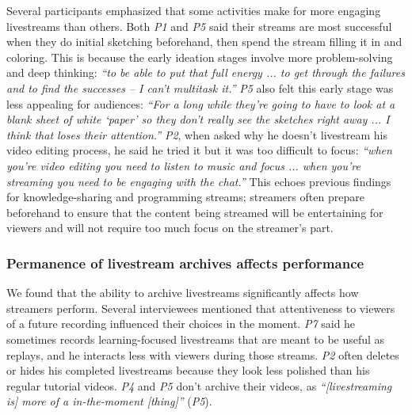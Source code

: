Several participants emphasized that some activities make for more engaging livestreams than others. Both \textit{P1} and \textit{P5} said their streams are most successful when they do initial sketching beforehand, then spend the stream filling it in and coloring. This is because the early ideation stages involve more problem-solving and deep thinking: \textit{``to be able to put that full energy ... to get through the failures and to find the successes -- I can't multitask it.''} \textit{P5} also felt this early stage was less appealing for audiences: \textit{``For a long while they're going to have to look at a blank sheet of white `paper' so they don't really see the sketches right away ... I think that loses their attention.''} \textit{P2}, when asked why he doesn't livestream his video editing process, he said he tried it but it was too difficult to focus: \textit{``when you're video editing you need to listen to music and focus ... when you're streaming you need to be engaging with the chat.''} This echoes previous findings for knowledge-sharing \cite{Lu2018a} and programming \cite{Faas2018} streams; streamers often prepare beforehand to ensure that the content being streamed will be entertaining for viewers and will not require too much focus on the streamer's part. 


\subsubsection{Permanence of livestream archives affects performance}
We found that the ability to archive livestreams significantly affects how streamers perform. Several interviewees mentioned that attentiveness to viewers of a future recording influenced their choices in the moment. \textit{P7} said he sometimes records learning-focused livestreams that are meant to be useful as replays, and he interacts less with viewers during those streams. \textit{P2} often deletes or hides his completed livestreams because they look less polished than his regular tutorial videos. 
\textit{P4} and \textit{P5} don't archive their videos, as \textit{``[livestreaming is] more of a in-the-moment [thing]''} (\textit{P5}). 